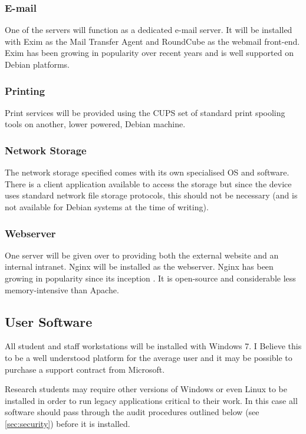 \documentclass[a4paper, twoside]{article}
\begin{document}
\subsubsection{E-mail}
One of the servers will function as a dedicated e-mail server. It will be
installed with Exim as the Mail Transfer Agent and RoundCube as the webmail
front-end. Exim has been growing in popularity over recent years and is well
supported on Debian platforms\cite{exim}.

\subsubsection{Printing}
Print services will be provided using the CUPS set of standard print spooling
tools on another, lower powered, Debian machine.

\subsubsection{Network Storage}
The network storage specified comes with its own specialised OS and software.
There is a client application available to access the storage but since the
device uses standard network file storage protocols, this should not be
necessary (and is not available for Debian systems at the time of writing).

\subsubsection{Webserver}
One server will be given over to providing both the external website and an
internal intranet. Nginx will be installed as the webserver. Nginx has been
growing in popularity since its inception \cite{nginx}. It is open-source and considerable
less memory-intensive than Apache.

\subsection{User Software}
All student and staff workstations will be installed with Windows 7. I Believe
this to be a well understood platform for the average user and it may be
possible to purchase a support contract from Microsoft.

Research students may require other versions of Windows or even Linux to be
installed in order to run legacy applications critical to their work. In this
case all software should pass through the audit procedures outlined below (see
\ref{sec:security}) before it is installed.
\end{document}
